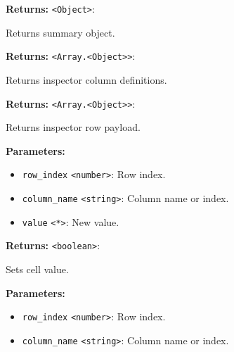 \documentclass[12pt,a4paper]{article}
\begin{document}
\vspace{5mm}
\noindent {}


\noindent \textbf{Returns:} \texttt{<Object>}:

\noindent Returns summary object.

\vspace{5mm}
\noindent {}


\noindent \textbf{Returns:} \texttt{<Array.<Object>>}:

\noindent Returns inspector column definitions.

\vspace{5mm}
\noindent {}


\noindent \textbf{Returns:} \texttt{<Array.<Object>>}:

\noindent Returns inspector row payload.

\vspace{5mm}
\noindent {}


\noindent \textbf{Parameters:}
\begin{itemize}
  \item \texttt{row\_index} \texttt{<number>}: Row index.
  \item \texttt{column\_name} \texttt{<string>}: Column name or index.
  \item \texttt{value} \texttt{<*>}: New value.
\end{itemize}

\noindent \textbf{Returns:} \texttt{<boolean>}:

\noindent Sets cell value.

\vspace{5mm}
\noindent {}


\noindent \textbf{Parameters:}
\begin{itemize}
  \item \texttt{row\_index} \texttt{<number>}: Row index.
  \item \texttt{column\_name} \texttt{<string>}: Column name or index.
\end{itemize}
\end{document}

